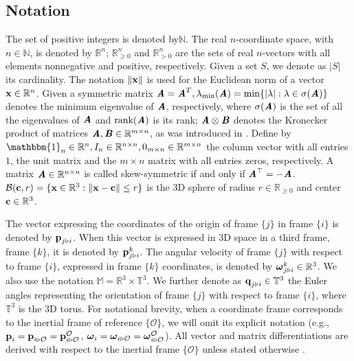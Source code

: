 \subsection{Notation}

The set of positive integers is denoted by$\mathbb{N}$. The real $n$-coordinate
space, with $n\in\mathbb{N}$, is denoted by $\mathbb{R}^n$;
$\mathbb{R}^n_{\geq 0}$ and $\mathbb{R}^n_{> 0}$ are the sets of real
$n$-vectors with all elements nonnegative and positive, respectively. Given a
set $S$, we denote as $\lvert S\lvert$ its cardinality. The notation
$\|\bm{\mathbf{x}}\|$ is used for the Euclidean norm of a vector
$\bm{\mathbf{x}} \in \mathbb{R}^n$. Given a symmetric matrix
$\bm{\mathit{A}} = \bm{\mathit{A}}^T, \lambda_{\text{min}}(\bm{\mathit{A}}) = \min \{|\lambda| : \lambda \in \sigma(\bm{\mathit{A}}) \}$
denotes the minimum eigenvalue of $\bm{\mathit{A}}$, respectively, where
$\sigma(\bm{\mathit{A}})$ is the set of all the eigenvalues of
$\bm{\mathit{A}}$ and $\text{rank}(\bm{\mathit{A}})$ is its rank;
$\bm{\mathit{A}} \otimes \bm{\mathit{B}}$ denotes the Kronecker product of matrices
$\bm{\mathit{A}}, \bm{\mathit{B}} \in \mathbb{R}^{m \times n}$,
as was introduced in \cite{horn_jonshon}.
Define by
$\mathbbm{1}_n \in \mathbb{R}^n, I_n \in \mathbb{R}^{n \times n}, 0_{m \times n} \in \mathbb{R}^{m \times n}$
the column vector with all entries $1$, the unit matrix and the $m \times n$
matrix with all entries zeros, respectively.
A matrix $\bm{\mathit{A}} \in \mathbb{R}^{n \times n}$ is called skew-symmetric if and only
if $\bm{\mathit{A}}^\top = -\bm{\mathit{A}}$.
$\mathcal{B}(\bm{\mathbf{c}},r) = \{\bm{\mathbf{x}} \in \mathbb{R}^3: \|\bm{\mathbf{x}}-\bm{\mathbf{c}}\| \leq r\}$
is the $3$D sphere of radius $r \in \mathbb{R}_{\ge 0}$ and center
$\bm{\mathbf{c}}\in\mathbb{R}^{3}$.

The vector expressing the coordinates of the origin of frame $\{j\}$ in
frame $\{i\}$ is denoted by $\bm{\mathbf{p}}_{j \triangleright i}$. When this vector is
expressed in 3D space in a third frame, frame $\{k\}$, it is denoted by
$\bm{\mathbf{p}}_{j \triangleright i}^{k}$.
The angular velocity of frame $\{j\}$ with respect to frame $\{i\}$, expressed
in frame $\{k\}$ coordinates, is denoted by
$\bm{\mathbf{\omega}}^k_{j \triangleright i}\in \mathbb{R}^{3}$.
We also use the notation $\mathbb{M} = \mathbb{R}^3\times \mathbb{T}^3$.
We further denote as $\bm{\mathbf{q}}_{j \triangleright i} \in \mathbb{T}^3$
the Euler angles representing the orientation of frame $\{j\}$ with respect to
frame $\{i\}$, where $\mathbb{T}^3$ is the $3$D torus.
For notational brevity, when a coordinate frame corresponds to the inertial frame
of reference $\{\mathcal{O}\}$, we will omit its explicit notation
(e.g., $\bm{\mathbf{p}}_i = \bm{\mathbf{p}}_{i \triangleright \mathcal{O}} = \bm{\mathbf{p}}^\mathcal{O}_{i \triangleright \mathcal{O}}$,
$\bm{\mathbf{\omega}}_i = \bm{\mathbf{\omega}}_{i \triangleright \mathcal{O}} = \bm{\mathbf{\omega}}^\mathcal{O}_{i \triangleright \mathcal{O}}$).
All vector and matrix differentiations are derived with respect to the inertial
frame $\{\mathcal{O}\}$ unless stated otherwise .


